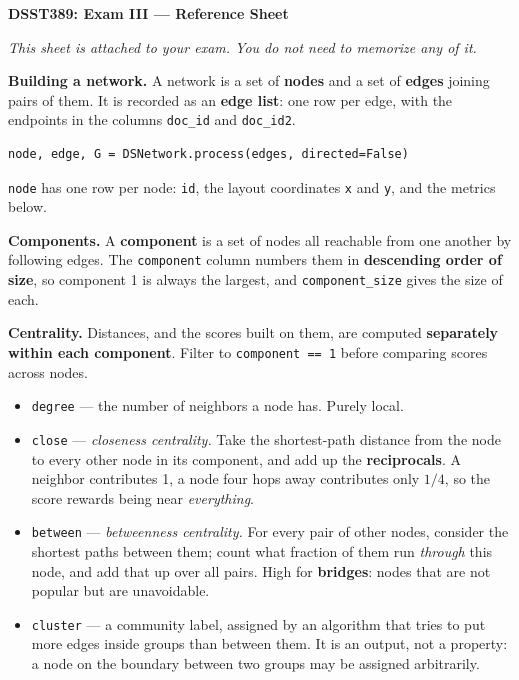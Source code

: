 \documentclass[11pt, a4paper]{article}
\newcommand{\code}[1]{\texttt{#1}}
\begin{document}
\small
\sloppy

\begin{center}
\normalsize\textbf{DSST389: Exam III --- Reference Sheet}
\end{center}

\smallskip

\textit{This sheet is attached to your exam. You do not need to memorize any of it.}

\smallskip

\textbf{Building a network.}
A network is a set of \textbf{nodes} and a set of \textbf{edges} joining pairs of them. It is
recorded as an \textbf{edge list}: one row per edge, with the endpoints in the columns
\code{doc\_id} and \code{doc\_id2}.

\begin{verbatim}
node, edge, G = DSNetwork.process(edges, directed=False)
\end{verbatim}

\code{node} has one row per node: \code{id}, the layout coordinates \code{x} and \code{y}, and
the metrics below.

\smallskip

\textbf{Components.}
A \textbf{component} is a set of nodes all reachable from one another by following edges. The
\code{component} column numbers them in \textbf{descending order of size}, so component 1 is
always the largest, and \code{component\_size} gives the size of each.

\smallskip

\textbf{Centrality.}
Distances, and the scores built on them, are computed \textbf{separately within each
component}. Filter to \code{component == 1} before comparing scores across nodes.

\begin{itemize}
  \item \code{degree} --- the number of neighbors a node has. Purely local.
  \item \code{close} --- \textit{closeness centrality.} Take the shortest-path distance from
        the node to every other node in its component, and add up the \textbf{reciprocals}. A
        neighbor contributes 1, a node four hops away contributes only $1/4$, so the score
        rewards being near \textit{everything}.
  \item \code{between} --- \textit{betweenness centrality.} For every pair of other nodes,
        consider the shortest paths between them; count what fraction of them run
        \textit{through} this node, and add that up over all pairs. High for
        \textbf{bridges}: nodes that are not popular but are unavoidable.
  \item \code{cluster} --- a community label, assigned by an algorithm that tries to put more
        edges inside groups than between them. It is an output, not a property: a node on the
        boundary between two groups may be assigned arbitrarily.
\end{itemize}
\end{document}
